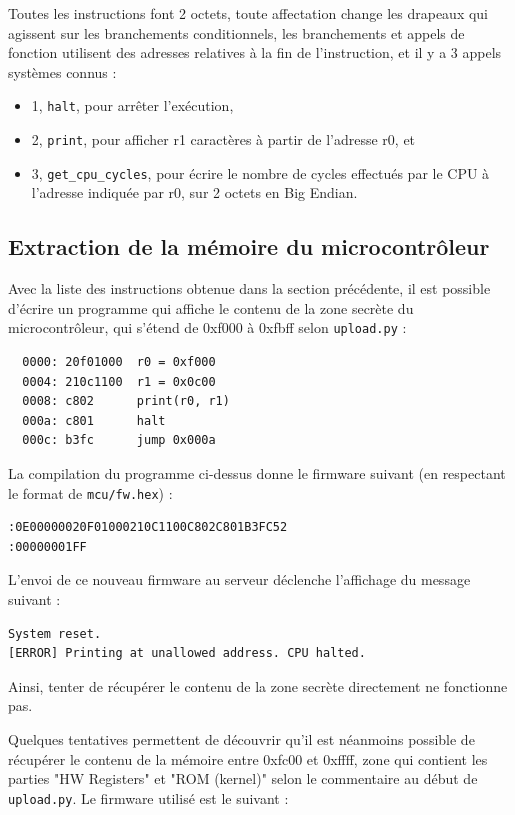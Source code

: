 \documentclass[a4paper,10pt]{article}
\begin{document}
Toutes les instructions font 2 octets, toute affectation change les drapeaux qui agissent sur les branchements conditionnels, les branchements et appels de fonction utilisent des adresses relatives à la fin de l'instruction, et il y a 3 appels systèmes connus :
\begin{itemize}
\item 1, \texttt{halt}, pour arrêter l'exécution,
\item 2, \texttt{print}, pour afficher r1 caractères à partir de l'adresse r0, et
\item 3, \texttt{get\_cpu\_cycles}, pour écrire le nombre de cycles effectués par le CPU à l'adresse indiquée par r0, sur 2 octets en Big Endian.
\end{itemize}

\subsection{Extraction de la mémoire du microcontrôleur}

Avec la liste des instructions obtenue dans la section précédente, il est possible d'écrire un programme qui affiche le contenu de la zone secrète du microcontrôleur, qui s'étend de 0xf000 à 0xfbff selon \texttt{upload.py} :

\begin{verbatim}
  0000: 20f01000  r0 = 0xf000
  0004: 210c1100  r1 = 0x0c00
  0008: c802      print(r0, r1)
  000a: c801      halt
  000c: b3fc      jump 0x000a
\end{verbatim}

La compilation du programme ci-dessus donne le firmware suivant (en respectant le format de \texttt{mcu/fw.hex}) :
\begin{verbatim}
:0E00000020F01000210C1100C802C801B3FC52
:00000001FF
\end{verbatim}

L'envoi de ce nouveau firmware au serveur déclenche l'affichage du message suivant :
\begin{verbatim}
System reset.
[ERROR] Printing at unallowed address. CPU halted.
\end{verbatim}

Ainsi, tenter de récupérer le contenu de la zone secrète directement ne fonctionne pas.

Quelques tentatives permettent de découvrir qu'il est néanmoins possible de récupérer le contenu de la mémoire entre 0xfc00 et 0xffff, zone qui contient les parties "HW Registers" et "ROM (kernel)" selon le commentaire au début de \texttt{upload.py}. Le firmware utilisé est le suivant :
\end{document}

